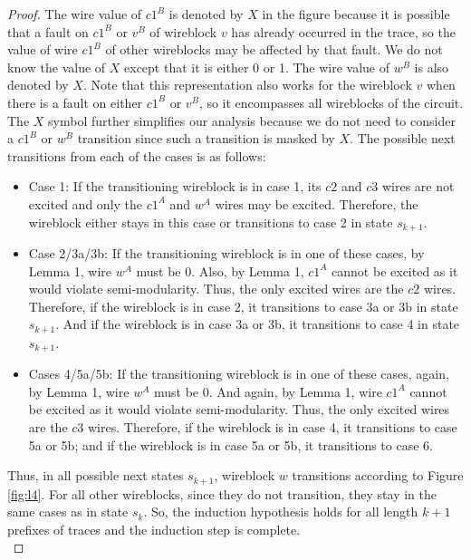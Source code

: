 \documentclass[12pt]{report}
\begin{document}
\begin{proof}
The wire value of $c1^B$ is denoted by $X$ in the figure because it is possible that a fault on $c1^B$ or $v^B$ of wireblock $v$ has already occurred in the trace, so the value of wire $c1^B$ of other wireblocks may be affected by that fault. We do not know the value of $X$ except that it is either 0 or 1.  The wire value of $w^B$ is also denoted by $X$. Note that this representation also works for the wireblock $v$ when there is a fault on either $c1^B$ or $v^B$, so it encompasses all wireblocks of the circuit.  
The $X$ symbol further simplifies our analysis because we do not need to consider a $c1^B$ or $w^B$ transition since such a transition is masked by $X$.  %
The possible next transitions from each of the cases is as follows:
\begin{itemize}
\item
Case 1: If the transitioning wireblock is in case 1, its $c2$ and $c3$ wires are not excited and only the $c1^A$ and $w^A$ wires may be excited. Therefore, the wireblock either stays in this case or transitions to case 2 in state $s_{k+1}$. %
\item
Case 2/3a/3b: If the transitioning wireblock is in one of these cases, by Lemma 1, wire $w^A$ must be 0. Also, by Lemma 1, $c1^A$ cannot be excited as it would violate semi-modularity. Thus, the only excited wires are the $c2$ wires. 
Therefore, if the wireblock is in case 2, it transitions to case 3a or 3b in state $s_{k+1}$. And if the wireblock is in case 3a or 3b, it transitions to case 4 in state $s_{k+1}$.
\item
Cases 4/5a/5b: If the transitioning wireblock is in one of these cases, again, by Lemma 1, wire $w^A$ must be 0. And again, by Lemma 1, wire $c1^A$ cannot be excited as it would violate semi-modularity. Thus, the only excited wires are the $c3$ wires. Therefore, if the wireblock is in case 4, it transitions to case 5a or 5b; and if the wireblock is in case 5a or 5b, it transitions to case 6.
\end{itemize}
Thus, in all possible next states $s_{k+1}$, wireblock $w$ transitions according to Figure \ref{fig:l4}. For all other wireblocks, since they do not transition, they stay in the same cases as in state $s_k$. So, the induction hypothesis holds for all length $k+1$ prefixes of traces and the induction step is complete. \\ 


\end{proof}
\end{document}
